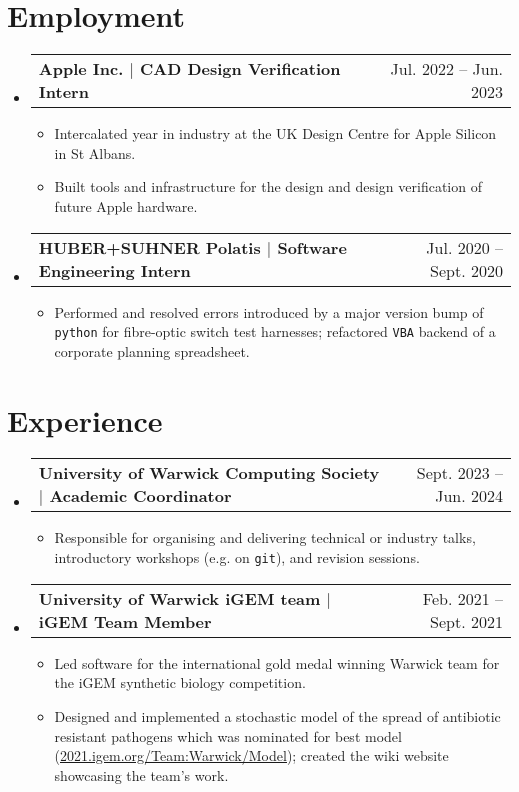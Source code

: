 \documentclass[letterpaper,11pt]{article}
\makeatletter
\newcommand{\resumeItem}[1]{
  \item\small{
    {#1 \vspace{-2pt}}
  }
}
\newcommand{\resumeProjectHeading}[2]{
    \item
    \begin{tabular*}{0.97\textwidth}{l@{\extracolsep{\fill}}r}
      \textbf{#1} & #2 \\
    \end{tabular*}\vspace{-7pt}
}
\newcommand{\resumeSubHeadingListStart}{\begin{itemize}[leftmargin=0.15in, label={}]}
\newcommand{\resumeSubHeadingListEnd}{\end{itemize}}
\newcommand{\resumeItemListStart}{\begin{itemize}[leftmargin=0.2in]}
\newcommand{\resumeItemListEnd}{\end{itemize}\vspace{-5pt}}
\makeatother
\begin{document}
\section{Employment}
  \resumeSubHeadingListStart
    \resumeProjectHeading
      {Apple Inc. $|$ CAD Design Verification Intern}{Jul. 2022 -- Jun. 2023}
      \resumeItemListStart
        \resumeItem{Intercalated year in industry at the UK Design Centre for Apple Silicon in St Albans.}
        \resumeItem{Built tools and infrastructure for the design and design verification of future Apple hardware.}
      \resumeItemListEnd
    \resumeProjectHeading
      {HUBER+SUHNER Polatis $|$ Software Engineering Intern}{Jul. 2020 -- Sept. 2020}
      \resumeItemListStart
        \resumeItem{Performed and resolved errors introduced by a major version bump of \texttt{python} for fibre-optic switch test harnesses; refactored \texttt{VBA} backend of a corporate planning spreadsheet.}
      \resumeItemListEnd
      \resumeSubHeadingListEnd

\section{Experience}
  \resumeSubHeadingListStart
    \resumeProjectHeading
      {University of Warwick Computing Society $|$ Academic Coordinator}{Sept. 2023 -- Jun. 2024}
      \resumeItemListStart
        \resumeItem{Responsible for organising and delivering technical or industry talks, introductory workshops (e.g. on \texttt{git}), and revision sessions.}
      \resumeItemListEnd
    \resumeProjectHeading
      {University of Warwick iGEM team $|$ iGEM Team Member}{Feb. 2021 -- Sept. 2021}
      \resumeItemListStart
        \resumeItem{Led software for the international gold medal winning Warwick team for the iGEM synthetic biology competition.}
        \resumeItem{Designed and implemented a stochastic model of the spread of antibiotic resistant pathogens which was nominated for best model (\href{https://2021.igem.org/Team:Warwick/Model}{\underline{2021.igem.org/Team:Warwick/Model}}); created the wiki website showcasing the team's work.}
    \resumeItemListEnd
  \resumeSubHeadingListEnd


\end{document}
